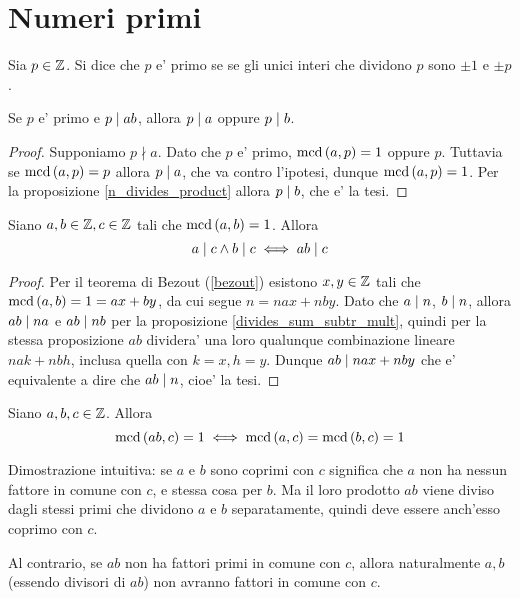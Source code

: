 \section{Numeri primi}

\begin{definition}
    Sia $p \in \mathbb{Z}$. Si dice che $p$ e' primo se se gli unici interi che dividono $p$ sono
    $\pm 1$ e $\pm p$.
\end{definition}

\begin{proposition}
    Se $p$ e' primo e $p \mid ab$, allora $p \mid a$ oppure $p \mid b$.
\end{proposition}
\begin{proof}
    Supponiamo $p \nmid a$. Dato che $p$ e' primo, $\operatorname{mcd}\left(a, p\right) = 1$ oppure $p$.
    Tuttavia se $\operatorname{mcd}\left(a, p\right) = p$ allora $p \mid a$, che va contro l'ipotesi, dunque 
    $\operatorname{mcd}\left(a, p\right) = 1$. Per la proposizione \ref{n_divides_product} allora $p \mid b$, che e' la tesi.
\end{proof}

\begin{proposition} \label{prodotto_numeri_coprimi}
    Siano $a, b \in \mathbb{Z}, c \in \mathbb{Z}$ tali che $\operatorname{mcd}\left(a, b\right) = 1$. Allora
    \begin{equation}
        a \mid c \land b \mid c \iff ab \mid c
    \end{equation}
\end{proposition}
\begin{proof}
    Per il teorema di Bezout (\ref{bezout}) esistono $x, y \in \mathbb{Z}$ tali che $\operatorname{mcd}\left(a, b\right) = 1 = ax+by$, da cui segue $n = nax + nby$. 
    Dato che $a \mid n$, $b \mid n$, allora $ab \mid na$ e $ab \mid nb$ per la proposizione \ref{divides_sum_subtr_mult}, quindi per la stessa proposizione $ab$ dividera' una loro qualunque combinazione lineare $nak + nbh$, inclusa quella con $k = x, h = y$.
    Dunque $ab \mid nax + nby$ che e' equivalente a dire che $ab \mid n$, cioe' la tesi.
\end{proof}


\begin{proposition} \label{prodotto_coprimo_2}
    Siano $a, b, c \in \mathbb{Z}$. Allora
    \begin{equation}
        \operatorname{mcd}\left(ab, c\right) = 1 \iff \operatorname{mcd}\left(a, c\right) = \operatorname{mcd}\left(b, c\right) = 1
    \end{equation}
\end{proposition}
\begin{intuition}
    Dimostrazione intuitiva: se $a$ e $b$ sono coprimi con $c$ significa che $a$ non ha nessun fattore in comune con $c$, e stessa cosa per $b$. Ma il loro prodotto $ab$ viene diviso dagli stessi primi che dividono $a$ e $b$ separatamente, quindi deve essere anch'esso coprimo con $c$.

    Al contrario, se $ab$ non ha fattori primi in comune con $c$, allora naturalmente $a, b$ (essendo divisori di $ab$) non avranno fattori in comune con $c$.
\end{intuition}

